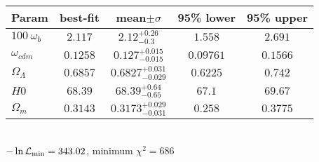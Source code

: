 \begin{tabular}{|l|c|c|c|c|} 
 \hline 
Param & best-fit & mean$\pm\sigma$ & 95\% lower & 95\% upper \\ \hline 
$100~\omega_{b }$ &$2.117$ & $2.12_{-0.3}^{+0.26}$ & $1.558$ & $2.691$ \\ 
$\omega_{cdm }$ &$0.1258$ & $0.127_{-0.015}^{+0.015}$ & $0.09761$ & $0.1566$ \\ 
$\Omega_{\Lambda }$ &$0.6857$ & $0.6827_{-0.029}^{+0.031}$ & $0.6225$ & $0.742$ \\ 
$H0$ &$68.39$ & $68.39_{-0.65}^{+0.64}$ & $67.1$ & $69.67$ \\ 
$\Omega_{m }$ &$0.3143$ & $0.3173_{-0.031}^{+0.029}$ & $0.258$ & $0.3775$ \\ 
\hline 
 \end{tabular} \\ 
$-\ln{\cal L}_\mathrm{min} =343.02$, minimum $\chi^2=686$ \\ 
